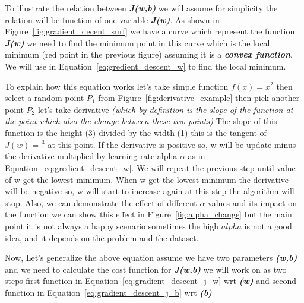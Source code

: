 

To illustrate the relation between \textbf{\textit{J(w,b)}} we will assume for simplicity the relation will be function of one variable \textbf{\textit{J(w)}}. As shown in Figure~\ref{fig:gradient_decent_surf} we have a curve which represent the function \textbf{\textit{J(w)}} we need to find the minimum point in this curve which is the local minimum (red point in the previous figure) assuming it is a  \textbf{\textit{convex function}}. We will use in Equation~\eqref{eq:gredient_descent_w} to find the local minimum.

To explain how this equation works let's take simple function $f(x) = x^2$ then select a random point $P_1$ from Figure~\ref{fig:derivative_example} then pick another point $P_2$ let's take derivative \textit{(which by definition is the slope of the function at the point which also the change between these two points)} The slope of this function is the height (3) divided by the width (1) this is the tangent of $J(w)=\frac{3}{1}$ at this point. If the derivative is positive so, w will be update minus the derivative multiplied by learning rate alpha $\alpha$ as in Equation~\eqref{eq:gredient_descent_w}. We will repeat the previous step until value of w get the lowest minimum. When w get the lowest minimum the derivative will be negative so, w will start to increase again at this step the algorithm will stop. Also, we can demonstrate the effect of different $\alpha$ values and its impact on the function we can show this effect in Figure~\ref{fig:alpha_change} but the main point it is not always a happy scenario sometimes the high $alpha$ is not a good idea, and it depends on the problem and the dataset.

Now, Let's generalize the above equation assume we have two parameters  \textbf{\textit{(w,b)}} and we need to calculate the cost function for  \textbf{\textit{J(w,b)}} we will work on as two steps first function in Equation~\eqref{eq:gradient_descent_j_w}  wrt \textbf{\textit{(w)}} and second function in Equation~\eqref{eq:gradient_descent_j_b} wrt \textbf{\textit{(b)}}



\begin{figure}[!h]
\subfigure[Derivative Example of function $f(x) = x^2$]{~\label{fig:derivative_example}
}
\subfigure[Derivative Example of function  $f(x) = x^2$ where $\alpha_1$ > $\alpha_2$]{\label{fig:alpha_change}
}
\end{figure}


